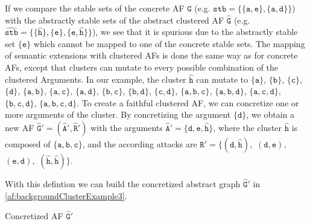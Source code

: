 If we compare the stable sets of the concrete AF $\mathtt{G}$ (e.g. $\mathtt{stb=\{\{a, e\}, \{a, d\}\}}$) with the abstractly stable sets of the abstract clustered AF $\mathtt{\hat{G}}$ (e.g. $\mathtt{\hat{stb}=\{\{\hat{h}\}, \{e\}, \{e, \hat{h}\}\}}$), we see that it is spurious due to the abstractly stable set $\mathtt{\{e\}}$ which cannot be mapped to one of the concrete stable sets. The mapping of semantic extensions with clustered AFs is done the same way as for concrete AFs, except that clusters can mutate to every possible combination of the clustered Arguments. In our example, the cluster $\mathtt{\hat{h}}$ can mutate to $\mathtt{\{a\}}$, $\mathtt{\{b\}}$, $\mathtt{\{c\}}$, $\mathtt{\{d\}}$, $\mathtt{\{a, b\}}$, $\mathtt{\{a, c\}}$, $\mathtt{\{a, d\}}$, $\mathtt{\{b, c\}}$, $\mathtt{\{b, d\}}$, $\mathtt{\{c, d\}}$, $\mathtt{\{a, b, c\}}$, $\mathtt{\{a, b, d\}}$, $\mathtt{\{a, c, d\}}$, $\mathtt{\{b, c, d\}}$, $\mathtt{\{a, b, c, d\}}$.
To create a faithful clustered AF, we can concretize one or more arguments of the cluster. By concretizing the argument $\mathtt{\{d\}}$, we obtain a new AF $\mathtt{\hat{G}'=(\hat{A}', \hat{R}')}$ with the arguments $\mathtt{\hat{A}'=\{d, e, \hat{h}\}}$, where the cluster $\mathtt{\hat{h}}$ is composed of $\mathtt{\{a, b, c\}}$, and the according attacks are $\mathtt{\hat{R}'=\{(d, \hat{h}),}$
$\mathtt{(d, e),}$
$\mathtt{(e, d),}$
$\mathtt{(\hat{h}, \hat{h})\}}$.

With this defintion we can build the concretized abstract graph $\mathtt{\hat{G}'}$ in \cref{af:backgroundClusterExample3}.


\begin{example}[h]
    \centering
    \caption{Concretized AF $\mathtt{\hat{G}'}$}
    \label{af:backgroundClusterExample3}
\end{example}


